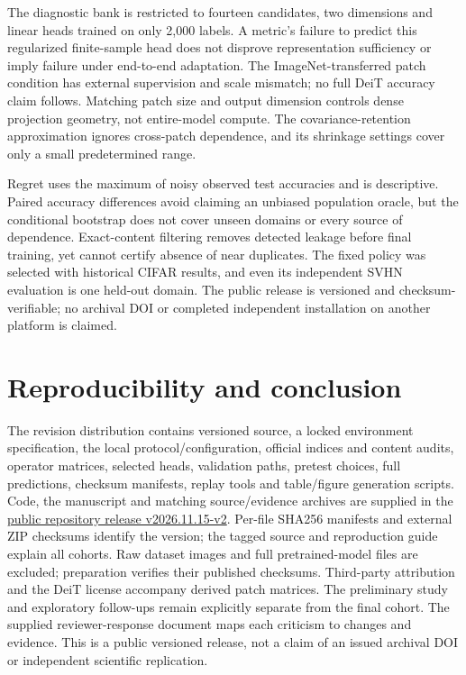\documentclass[11pt]{article}
\begin{document}
The diagnostic bank is restricted to fourteen candidates, two dimensions and linear heads trained on only 2,000 labels. A metric's failure to predict this regularized finite-sample head does not disprove representation sufficiency or imply failure under end-to-end adaptation. The ImageNet-transferred patch condition has external supervision and scale mismatch; no full DeiT accuracy claim follows. Matching patch size and output dimension controls dense projection geometry, not entire-model compute. The covariance-retention approximation ignores cross-patch dependence, and its shrinkage settings cover only a small predetermined range.

Regret uses the maximum of noisy observed test accuracies and is descriptive. Paired accuracy differences avoid claiming an unbiased population oracle, but the conditional bootstrap does not cover unseen domains or every source of dependence. Exact-content filtering removes detected leakage before final training, yet cannot certify absence of near duplicates. The fixed policy was selected with historical CIFAR results, and even its independent SVHN evaluation is one held-out domain. The public release is versioned and checksum-verifiable; no archival DOI or completed independent installation on another platform is claimed.

\section{Reproducibility and conclusion}
The revision distribution contains versioned source, a locked environment specification, the local protocol/configuration, official indices and content audits, operator matrices, selected heads, validation paths, pretest choices, full predictions, checksum manifests, replay tools and table/figure generation scripts. Code, the manuscript and matching source/evidence archives are supplied in the \href{https://github.com/AnkitGuin/Task-Dependent-VIT-Patch-Loss/releases/tag/v2026.11.15-v2}{public repository release v2026.11.15-v2}. Per-file SHA256 manifests and external ZIP checksums identify the version; the tagged source and reproduction guide explain all cohorts. Raw dataset images and full pretrained-model files are excluded; preparation verifies their published checksums. Third-party attribution and the DeiT license accompany derived patch matrices. The preliminary study and exploratory follow-ups remain explicitly separate from the final cohort. The supplied reviewer-response document maps each criticism to changes and evidence. This is a public versioned release, not a claim of an issued archival DOI or independent scientific replication.
\end{document}
